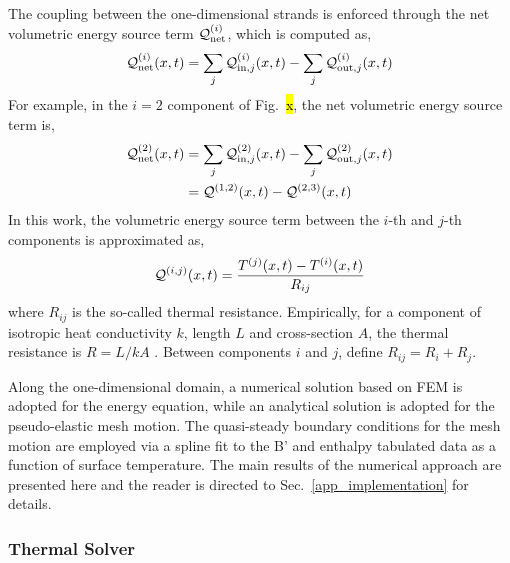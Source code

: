 The coupling between the one-dimensional strands is enforced through the net volumetric energy source term $\mathcal{Q}^{(i)}_{\text{net}}$, which is computed as,
\begin{equation}
    \mathcal{Q}^{(i)}_{\text{net}}(x,t) = \sum_j\mathcal{Q}^{(i)}_{\text{in},j}(x,t) - \sum_j\mathcal{Q}^{(i)}_{\text{out},j}(x,t)\label{eqn_net_volumetric_energy}
\end{equation}
For example, in the $i=2$ component of Fig.~\hl{x}, the net volumetric energy source term is,
\begin{subequations}
    \begin{align}
        \mathcal{Q}^{(2)}_{\text{net}}(x,t) &= \sum_j\mathcal{Q}^{(2)}_{\text{in},j}(x,t) - \sum_j\mathcal{Q}^{(2)}_{\text{out},j}(x,t)\notag\\
        &= \mathcal{Q}^{(1,2)}(x,t) - \mathcal{Q}^{(2,3)}(x,t)
    \end{align}
\end{subequations}
In this work, the volumetric energy source term between the $i$-th and $j$-th components is approximated as,
\begin{equation}
    \mathcal{Q}^{(i,j)}(x,t) = \frac{T^{(j)}(x,t) - T^{(i)}(x,t)}{R_{ij}}\label{eqn_volumetric_energy_approximation}
\end{equation}
where $R_{ij}$ is the so-called thermal resistance. Empirically, for a component of isotropic heat conductivity $k$, length $L$ and cross-section $A$, the thermal resistance is $R=L/kA$ . Between components $i$ and $j$, define $R_{ij} = R_i + R_j$.

Along the one-dimensional domain, a numerical solution based on FEM is adopted for the energy equation, while an analytical solution is adopted for the pseudo-elastic mesh motion. The quasi-steady boundary conditions for the mesh motion are employed via a spline fit to the B' and enthalpy tabulated data as a function of surface temperature. The main results of the numerical approach are presented here and the reader is directed to Sec.~\ref{app_implementation} for details.

\subsubsection{Thermal Solver}

